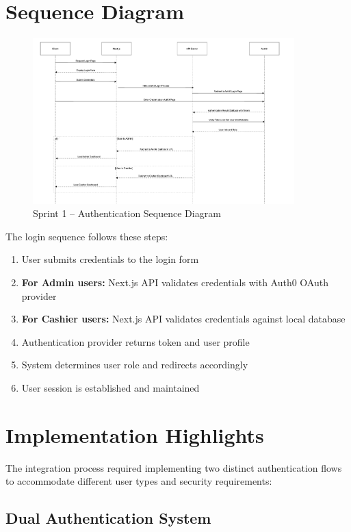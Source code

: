 \section{Sequence Diagram}

\begin{figure}[H]
  \centering
  \includegraphics[width=0.9\textwidth]{figures/images/sprint1sequence.png}
  \caption{Sprint 1 – Authentication Sequence Diagram}
  \label{fig:sprint1-sequence}
\end{figure}

The login sequence follows these steps:
\begin{enumerate}
  \item User submits credentials to the login form
  \item \textbf{For Admin users:} Next.js API validates credentials with Auth0 OAuth provider
  \item \textbf{For Cashier users:} Next.js API validates credentials against local database
  \item Authentication provider returns token and user profile
  \item System determines user role and redirects accordingly
  \item User session is established and maintained
\end{enumerate}

\section{Implementation Highlights}

The integration process required implementing two distinct authentication flows to accommodate different user types and security requirements:

\subsection*{Dual Authentication System}

